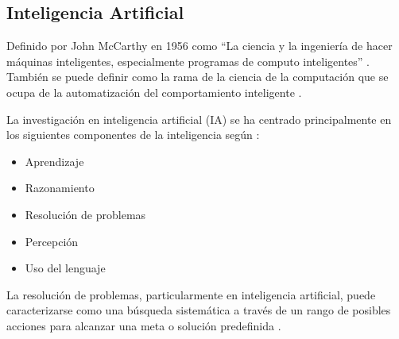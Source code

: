 
\subsection{Inteligencia Artificial}
Definido por John McCarthy en 1956 como “La ciencia y la ingeniería de hacer máquinas inteligentes, especialmente programas de computo inteligentes” \cite{ArtificialOverview}. También se puede definir como la rama de la ciencia de la computación que se ocupa de la automatización del comportamiento inteligente \cite{Luger2009ArtificialSolving}. 

La investigación en inteligencia artificial (IA) se ha centrado principalmente en los siguientes componentes de la inteligencia según \cite{Copeland2018ArtificialIntelligence,ArtificialOverview}:
\begin{itemize}[noitemsep]
    \item Aprendizaje
    \item Razonamiento
    \item Resolución de problemas
    \item Percepción
    \item Uso del lenguaje
\end{itemize}
La resolución de problemas, particularmente en inteligencia artificial, puede caracterizarse como una búsqueda sistemática a través de un rango de posibles acciones para alcanzar una meta o solución predefinida \cite{Copeland2018ArtificialIntelligence}.


